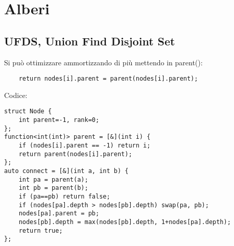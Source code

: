 \section{Alberi}

\subsection{UFDS, Union Find Disjoint Set}
Si può ottimizzare ammortizzando di più mettendo in parent():
\begin{lstlisting}
    return nodes[i].parent = parent(nodes[i].parent);
\end{lstlisting}
Codice:
\begin{lstlisting}
struct Node {
    int parent=-1, rank=0;
};
function<int(int)> parent = [&](int i) {
    if (nodes[i].parent == -1) return i;
    return parent(nodes[i].parent);
};
auto connect = [&](int a, int b) {
    int pa = parent(a);
    int pb = parent(b);
    if (pa==pb) return false;
    if (nodes[pa].depth > nodes[pb].depth) swap(pa, pb);
    nodes[pa].parent = pb;
    nodes[pb].depth = max(nodes[pb].depth, 1+nodes[pa].depth);
    return true;
};
\end{lstlisting}

